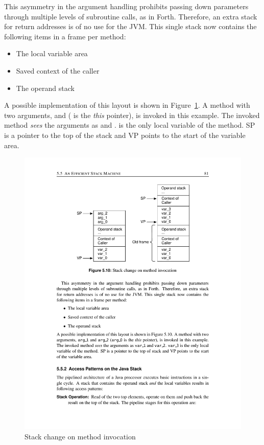 This asymmetry in the argument handling prohibits passing down
parameters through multiple levels of subroutine calls, as in Forth.
Therefore, an extra stack for return addresses is of no use for the
JVM. This single stack now contains the following items in a frame
per method:
%
\begin{itemize}
\item The local variable area
\item Saved context of the caller
\item The operand stack
\end{itemize}
%
A possible implementation of this layout is shown in
Figure~\ref{fig_stack_invoke}. A method with two arguments,
 and  ( is the
\emph{this} pointer), is invoked in this example. The invoked method
\emph{sees} the arguments as  and .
 is the only local variable of the method. SP is a
pointer to the top of the stack and VP points to the start of the
variable area.

\begin{figure}
    \centering
    \includegraphics[scale=\picscale]{stack/stack_invocation}
    \caption{Stack change on method invocation}
    \label{fig_stack_invoke}
\end{figure}

